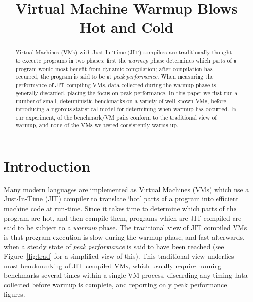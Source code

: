 \documentclass[preprint,numbers,10pt]{sigplanconf}
\begin{document}
\title{Virtual Machine Warmup Blows Hot and Cold}



\maketitle

\begin{abstract}
Virtual Machines (VMs) with Just-In-Time (JIT) compilers are traditionally thought
to execute programs in two phases: first the \emph{warmup} phase determines which
parts of a program would most benefit from dynamic compilation; after
compilation has occurred, the program is said to be at \emph{peak performance}.
When measuring the performance of JIT compiling VMs, data collected
during the warmup phase is generally discarded, placing the focus on peak
performance. In this paper we first run a number of small,
deterministic benchmarks on a variety of well known VMs, before introducing
a rigorous statistical model for determining when warmup has occurred.
In our experiment,  of the benchmark/VM pairs conform to
the traditional view of warmup, and none of the
VMs we tested consistently warms up.
\end{abstract}

\section{Introduction}
\label{sec:intro}

Many modern languages are implemented as Virtual Machines (VMs) which use a
Just-In-Time (JIT) compiler to translate `hot' parts of a program into efficient
machine code at run-time. Since it takes time to determine which parts of the
program are hot, and then compile them, programs which are JIT compiled are
said to be subject to a \emph{warmup} phase. The traditional view of
JIT compiled VMs is that program execution is slow during the warmup phase, and
fast afterwards, when a steady state of \emph{peak performance} is said to have been reached
(see Figure~\ref{fig:trad} for a simplified view of this).
This traditional view underlies most benchmarking of JIT compiled VMs, which
usually require running benchmarks several times within a single VM process,
discarding any timing data collected before warmup is complete, and
reporting only peak performance figures.
\end{document}
